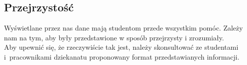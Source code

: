 \documentclass{article}
\begin{document}
\subsection{Przejrzystość}
Wyświetlane przez nas dane mają studentom przede wszystkim pomóc. Zależy nam na tym, aby były przedstawione w sposób przejrzysty i zrozumiały.
\\Aby upewnić się, że rzeczywiście tak jest, należy skonsultować ze studentami i~pracownikami dziekanatu proponowany format przedstawianych informacji.
\end{document}
